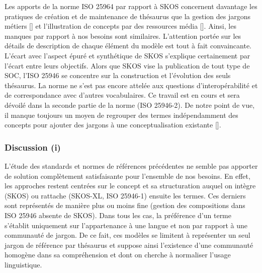 Les apports de la norme ISO 25964 par rapport à SKOS concernent davantage les pratiques de création et de maintenance de thésaurus que la gestion des jargons métiers [] et l'illustration de concepts par des ressources média []. 
Ainsi, les manques par rapport à nos besoins sont similaires. L'attention portée sur les détails de description de chaque élément du modèle est tout à fait convaincante. 
L'écart avec l'aspect épuré et synthétique de SKOS s'explique certainement par l'écart entre leurs objectifs. 
Alors que SKOS vise la publication de tout type de SOC, l'ISO 25946 se concentre sur la construction et l'évolution des seuls thésaurus. 
La norme ne s'est pas encore attelée aux questions d'interopérabilité et de correspondance avec d'autres vocabulaires. Ce travail est en cours et sera dévoilé dans la seconde partie de la norme (ISO 25946-2). 
De notre point de vue, il manque toujours un moyen de regrouper des termes indépendamment des concepts pour ajouter des jargons à une conceptualisation existante [].





\subsubsection{Discussion (i)}
L'étude des standards et normes de références précédentes ne semble pas apporter de solution complètement satisfaisante pour l'ensemble de nos besoins. 
En effet, les approches restent centrées sur le concept et sa structuration auquel on intègre (SKOS) ou rattache (SKOS-XL, ISO 25946-1) ensuite les termes. 
Ces derniers sont représentés de manière plus ou moins fine (gestion des compositions dans ISO 25946 absente de SKOS). 
Dans tous les cas, la préférence d'un terme s'établit uniquement sur l'appartenance à une langue et non par rapport à une communauté de jargon. %
De ce fait, ces modèles se limitent à représenter un seul jargon de référence par thésaurus et suppose ainsi l'existence d'une communauté homogène dans sa compréhension et dont on cherche à normaliser l'usage linguistique. %
